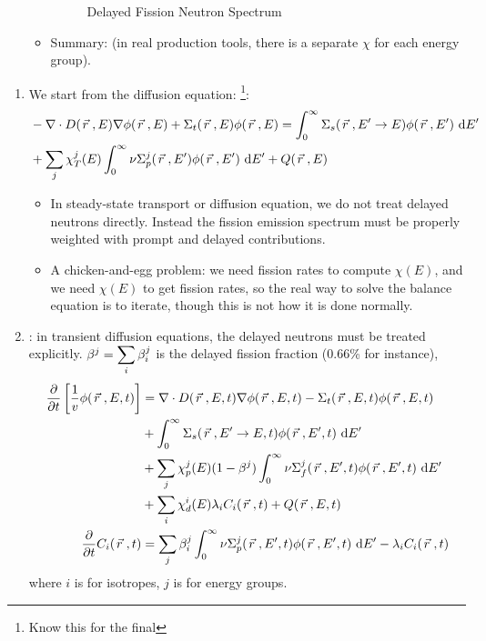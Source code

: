 \documentclass{school-22.211-notes}
\begin{document}
\begin{enumerate}
\begin{itemize}
\begin{figure}[ht]
      \caption{Delayed Fission Neutron Spectrum} \label{delayed-fission-spec} 
    \end{figure}
  \item Summary:  (in real production tools, there is a separate $\chi$ for each energy group). 
  \end{itemize}
\end{enumerate}

\clearpage
{}
\begin{enumerate}
\item We start from the diffusion equation: \footnote{Know this for the final}: 
\small
\begin{align}
& - \nabla \cdot D(\left.\vec{r}\right., E) \nabla \phi(\left.\vec{r}\right., E) + \Sigma_t (\left.\vec{r}\right., E) \phi(\left.\vec{r}\right., E) = \int_0^{\infty} \Sigma_s (\left.\vec{r}\right., E'\to E) \phi(\left.\vec{r}\right., E') \mbox{ }\mathrm{d} E' \\
&+ \displaystyle\sum_j \chi_T^j (E) \int_0^{\infty} \nu \Sigma_p^j (\left.\vec{r}\right., E') \phi(\left.\vec{r}\right., E') \mbox{ }\mathrm{d} E' + Q(\left.\vec{r}\right., E) 
\end{align}
\normalsize
\begin{itemize}
\item In steady-state transport or diffusion equation, we do not treat delayed neutrons directly. Instead the fission emission spectrum must be properly weighted with prompt and delayed contributions. 

\item A chicken-and-egg problem: we need fission rates to compute $\chi(E)$, and we need $\chi(E)$ to get fission rates, so the real way to solve the balance equation is to iterate, though this is not how it is done normally.
\end{itemize}


\item {}: in transient diffusion equations, the delayed neutrons must be treated explicitly. $\beta^j = \displaystyle\sum_i \beta_i^j$ is the delayed fission fraction (0.66\% for instance), 
  \begin{align}
    \frac{\partial}{\partial t} \left[ \frac{1}{v} \phi(\left.\vec{r}\right., E, t) \right] &= \nabla \cdot D(\left.\vec{r}\right., E, t) \nabla \phi(\left.\vec{r}\right., E, t) - \Sigma_t (\left.\vec{r}\right., E, t) \phi(\left.\vec{r}\right., E, t) 
\notag \\
    & + \int_0^{\infty} \Sigma_s (\left.\vec{r}\right., E'\to E, t) \phi(\left.\vec{r}\right., E', t) \mbox{ }\mathrm{d} E'\notag \\
    &+ \displaystyle\sum_j \chi_p^j (E) (1-\beta^j) \int_0^{\infty} \nu \Sigma_f^j (\left.\vec{r}\right., E', t) \phi(\left.\vec{r}\right., E', t) \mbox{ }\mathrm{d} E'\notag \\
    &+ \displaystyle\sum_i \chi_d^i (E) \lambda_i C_i (\left.\vec{r}\right., t) + Q(\left.\vec{r}\right., E, t)\\
    \frac{\partial}{\partial t} C_i (\left.\vec{r}\right., t) &= \displaystyle\sum_j \beta_i^j \int_0^{\infty} \nu \Sigma_p^j (\left.\vec{r}\right., E', t) \phi(\left.\vec{r}\right., E', t) \mbox{ }\mathrm{d} E'  - \lambda_i C_i (\left.\vec{r}\right., t) 
  \end{align}
  where $i$ is for isotropes, $j$ is for energy groups. 


\end{enumerate}
\end{document}
